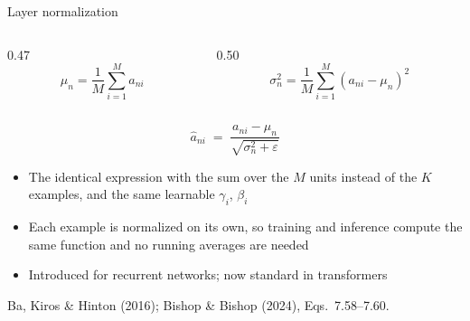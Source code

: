 \documentclass[aspectratio=169, 11pt]{beamer}
\newcommand{\srcline}[1]{%
  \par\vspace{0.25em}%
  {\scriptsize\color{mcMuted}\hfill #1\par}}
\begin{document}
\begin{frame}{Layer normalization}
  \vspace{-0.55em}
  \begin{columns}[T, onlytextwidth]
    \begin{column}{0.47\textwidth}
      \[ \mu_n = \frac{1}{M}\sum_{i=1}^{M} a_{ni} \]
    \end{column}
    \begin{column}{0.50\textwidth}
      \[ \sigma_n^2 = \frac{1}{M}\sum_{i=1}^{M}(a_{ni} - \mu_n)^2 \]
    \end{column}
  \end{columns}
  \vspace{-0.6em}
  \[
    \hat{a}_{ni} \;=\; \frac{a_{ni} - \mu_n}{\sqrt{\sigma_n^2 +
      \varepsilon}}
  \]
  \vspace{-0.7em}
  \begin{itemize}\itemsep0.28em
    \item The identical expression with the sum over the $M$
          \alert{units} instead of the $K$ examples, and the same
          learnable $\gamma_i$, $\beta_i$
    \item Each example is normalized on its own, so training and
          inference compute the \alert{same} function and no running
          averages are needed
    \item Introduced for recurrent networks; now standard in
          transformers
  \end{itemize}
  \srcline{Ba, Kiros \& Hinton (2016); Bishop \& Bishop (2024),
  Eqs.~7.58--7.60.}
\end{frame}
\end{document}
